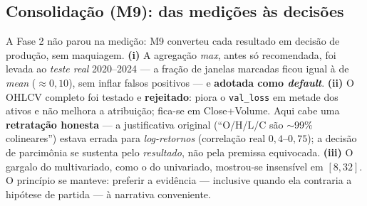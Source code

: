 \subsection{Consolidação (M9): das medições às decisões}
\label{sec:debate-fase2-m9}
A Fase 2 não parou na medição: M9 converteu cada resultado em decisão de produção, sem
maquiagem. \textbf{(i)} A agregação \emph{max}, antes só recomendada, foi levada ao \emph{teste
real} 2020--2024 --- a fração de janelas marcadas ficou igual à de \emph{mean} ($\approx 0{,}10$),
sem inflar falsos positivos --- e \textbf{adotada como \emph{default}}. \textbf{(ii)} O OHLCV
completo foi testado e \textbf{rejeitado}: piora o \texttt{val\_loss} em metade dos ativos e não
melhora a atribuição; fica-se em Close+Volume. Aqui cabe uma \textbf{retratação honesta} --- a
justificativa original (``O/H/L/C são $\sim$99\% colineares'') estava errada para
\emph{log-retornos} (correlação real $0{,}4$--$0{,}75$); a decisão de parcimônia se sustenta pelo
\emph{resultado}, não pela premissa equivocada. \textbf{(iii)} O gargalo do multivariado, como o
do univariado, mostrou-se insensível em $[8,32]$. O princípio se manteve: preferir a evidência
--- inclusive quando ela contraria a hipótese de partida --- à narrativa conveniente.
